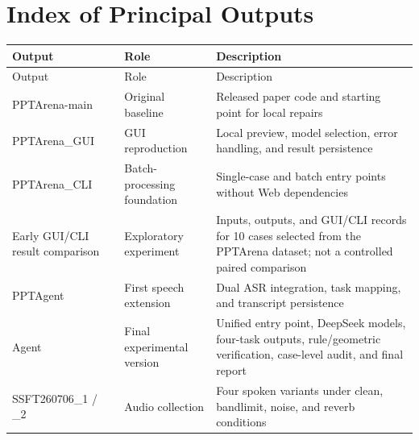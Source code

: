 \documentclass[11pt,a4paper,UTF8,fontset=fandol]{ctexart}
\renewcommand{\arraystretch}{1.25}
\begin{document}
\appendix
\section{Index of Principal Outputs}

\begingroup
\footnotesize
\renewcommand{\arraystretch}{1.05}
\setlength{\LTpre}{0.3em}
\setlength{\LTpost}{0pt}
\begin{longtable}{L{2.9cm} L{3.0cm} L{8.6cm}}
\toprule
Output & Role & Description \\
\midrule
\endfirsthead
\toprule
Output & Role & Description \\
\midrule
\endhead
PPTArena-main & Original baseline & Released paper code and starting point for local repairs \\
PPTArena\_GUI & GUI reproduction & Local preview, model selection, error handling, and result persistence \\
PPTArena\_CLI & Batch-processing foundation & Single-case and batch entry points without Web dependencies \\
Early GUI/CLI result comparison & Exploratory experiment & Inputs, outputs, and GUI/CLI records for 10 cases selected from the PPTArena dataset; not a controlled paired comparison \\
PPTAgent & First speech extension & Dual ASR integration, task mapping, and transcript persistence \\
Agent & Final experimental version & Unified entry point, DeepSeek models, four-task outputs, rule/geometric verification, case-level audit, and final report \\
SSFT260706\_1 / \_2 & Audio collection & Four spoken variants under clean, bandlimit, noise, and reverb conditions \\
\bottomrule
\end{longtable}
\endgroup
\end{document}

